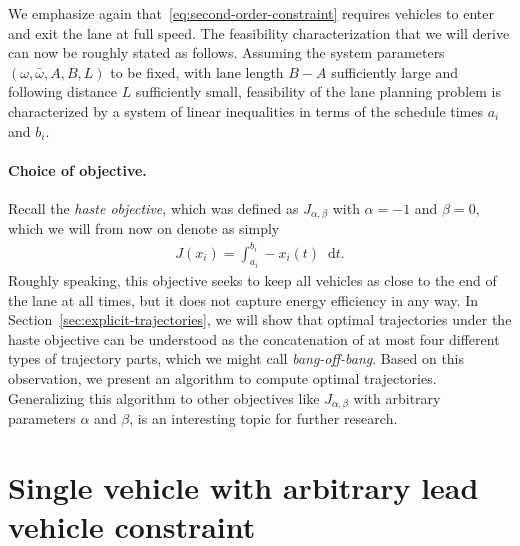 \documentclass[a4paper]{report}
\theoremstyle{definition}
\theoremstyle{plain}
\newcommand*\diff{\mathop{}\!\mathrm{d}}
\begin{document}
We emphasize again that~\eqref{eq:second-order-constraint} requires vehicles to
enter and exit the lane at full speed.
%
The feasibility characterization that we will derive can now be roughly stated
as follows. Assuming the system parameters $(\omega, \bar{\omega},A,B,L)$ to be
fixed, with lane length $B-A$ sufficiently large and following distance $L$
sufficiently small, feasibility of the lane planning problem is characterized by
a system of linear inequalities in terms of the schedule times $a_{i}$ and
$b_{i}$.

\paragraph{Choice of objective.}
Recall the \emph{haste objective}, which was defined as $J_{\alpha,\beta}$ with $\alpha=-1$ and $\beta=0$, which we will from now on denote as simply
\begin{align}\label{eq:haste-objective}
  J(x_{i}) = \int_{a_{i}}^{b_{i}} - x_{i}(t) \diff t .
\end{align}
%
Roughly speaking, this objective seeks to keep all vehicles as close to the end
of the lane at all times, but it does not capture energy efficiency in any way.
%
In Section~\ref{sec:explicit-trajectories}, we will show that optimal
trajectories under the haste objective can be understood as the concatenation of
at most four different types of trajectory parts, which we might call
\emph{bang-off-bang}. Based on this observation, we present an algorithm to compute
optimal trajectories.
%
Generalizing this algorithm to other objectives like $J_{\alpha,\beta}$ with
arbitrary parameters $\alpha$ and $\beta$, is an interesting topic for further research.



\section{Single vehicle with arbitrary lead vehicle constraint}\label{sec:single-vehicle-problem}
\end{document}
